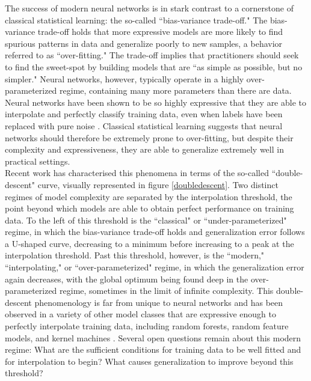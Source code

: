 \documentclass[a4paper, 12pt]{article}
\begin{document}
The success of modern neural networks is in stark contrast to a cornerstone of classical statistical learning: the so-called ``bias-variance trade-off." The bias-variance trade-off holds that more expressive models are more likely to find spurious patterns in data and generalize poorly to new samples, a behavior referred to as ``over-fitting." The trade-off implies that practitioners should seek to find the sweet-spot by building models that are ``as simple as possible, but no simpler." Neural networks, however, typically operate in a highly over-parameterized regime, containing many more parameters than there are data. Neural networks have been shown to be so highly expressive that they are able to interpolate and perfectly classify training data, even when labels have been replaced with pure noise \cite{zhangUnderstandingDeepLearning2017}. Classical statistical learning suggests that neural networks should therefore be extremely prone to over-fitting, but despite their complexity and expressiveness, they are able to generalize extremely well in practical settings.\\

Recent work \cite{belkinReconcilingModernMachine2019} has characterised this phenomena in terms of the so-called ``double-descent" curve, visually represented in figure \ref{doubledescent}. Two distinct regimes of model complexity are separated by the interpolation threshold, the point beyond which models are able to obtain perfect performance on training data. To the left of this threshold is the ``classical" or ``under-parameterized" regime, in which the bias-variance trade-off holds and generalization error follows a U-shaped curve, decreasing to a minimum before increasing to a peak at the interpolation threshold. Past this threshold, however, is the ``modern," ``interpolating," or ``over-parameterized" regime, in which the generalization error again decreases, with the global optimum being found deep in the over-parameterized regime, sometimes in the limit of infinite complexity. This double-descent phenomenology is far from unique to neural networks and has been observed in a variety of other model classes that are expressive enough to perfectly interpolate training data, including random forests, random feature models, and kernel machines \cite{ belkinReconcilingModernMachine2019, belkinUnderstandDeepLearning2018}. Several open questions remain about this modern regime: What are the sufficient conditions for training data to be well fitted and for interpolation to begin? What causes generalization to improve beyond this threshold?
\end{document}
